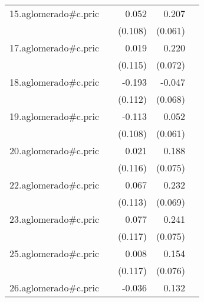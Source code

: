 {\begin{longtable}{l*{4}{D{.}{.}{-1}}}
\addlinespace
15.aglomerado#c.pric&                     &       0.052         &       0.207\sym{***}&                     \\
            &                     &     (0.108)         &     (0.061)         &                     \\
\addlinespace
17.aglomerado#c.pric&                     &       0.019         &       0.220\sym{**} &                     \\
            &                     &     (0.115)         &     (0.072)         &                     \\
\addlinespace
18.aglomerado#c.pric&                     &      -0.193         &      -0.047         &                     \\
            &                     &     (0.112)         &     (0.068)         &                     \\
\addlinespace
19.aglomerado#c.pric&                     &      -0.113         &       0.052         &                     \\
            &                     &     (0.108)         &     (0.061)         &                     \\
\addlinespace
20.aglomerado#c.pric&                     &       0.021         &       0.188\sym{*}  &                     \\
            &                     &     (0.116)         &     (0.075)         &                     \\
\addlinespace
22.aglomerado#c.pric&                     &       0.067         &       0.232\sym{***}&                     \\
            &                     &     (0.113)         &     (0.069)         &                     \\
\addlinespace
23.aglomerado#c.pric&                     &       0.077         &       0.241\sym{**} &                     \\
            &                     &     (0.117)         &     (0.075)         &                     \\
\addlinespace
25.aglomerado#c.pric&                     &       0.008         &       0.154\sym{*}  &                     \\
            &                     &     (0.117)         &     (0.076)         &                     \\
\addlinespace
26.aglomerado#c.pric&                     &      -0.036         &       0.132\sym{*}  &                     \\

\end{longtable}}
